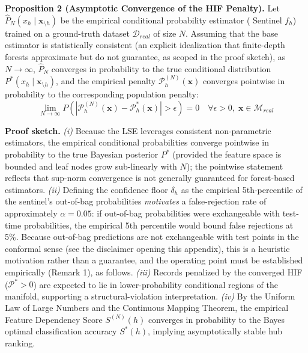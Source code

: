 \documentclass[pdflatex,sn-mathphys-num]{sn-jnl}
\theoremstyle{thmstyleone}%
\theoremstyle{thmstyletwo}%
\theoremstyle{thmstylethree}%
\begin{document}
\begin{appendices}
\textbf{Proposition 2 (Asymptotic Convergence of the HIF Penalty).} Let $\hat{P}_N(x_h \mid \mathbf{x}_{\setminus h})$ be the empirical conditional probability estimator ( Sentinel $f_h$) trained on a ground-truth dataset $\mathcal{D}_{real}$ of size $N$. Assuming that the base estimator is statistically consistent (an explicit idealization that finite-depth forests approximate but do not guarantee, as scoped in the proof sketch), as $N \to \infty$, $\hat{P}_N$ converges in probability to the true conditional distribution $P^*(x_h \mid \mathbf{x}_{\setminus h})$, and the empirical penalty $\mathcal{P}_h^{(N)}(\mathbf{x})$ converges pointwise in probability to the corresponding population penalty:
\begin{equation}
    \lim_{N \to \infty} P\left( \left| \mathcal{P}_h^{(N)}(\mathbf{x}) - \mathcal{P}_h^*(\mathbf{x}) \right| > \epsilon \right) = 0 \quad \forall \epsilon > 0, \; \mathbf{x} \in \mathcal{M}_{real}
\end{equation}

\textbf{Proof sketch.} \emph{(i)} Because the LSE leverages consistent non-parametric estimators, the empirical conditional probabilities converge pointwise in probability to the true Bayesian posterior $P^*$ (provided the feature space is bounded and leaf nodes grow sub-linearly with $N$); the pointwise statement reflects that sup-norm convergence is not generally guaranteed for forest-based estimators. \emph{(ii)} Defining the confidence floor $\delta_h$ as the empirical 5th-percentile of the sentinel's out-of-bag probabilities \emph{motivates} a false-rejection rate of approximately $\alpha = 0.05$: if out-of-bag probabilities were exchangeable with test-time probabilities, the empirical 5th percentile would bound false rejections at 5\%. Because out-of-bag predictions are not exchangeable with test points in the conformal sense (see the disclaimer opening this appendix), this is a heuristic motivation rather than a guarantee, and the operating point must be established empirically (Remark 1), as follows. \emph{(iii)} Records penalized by the converged HIF ($\mathcal{P}^* > 0$) are expected to lie in lower-probability conditional regions of the manifold, supporting a structural-violation interpretation. \emph{(iv)} By the Uniform Law of Large Numbers and the Continuous Mapping Theorem, the empirical Feature Dependency Score $S^{(N)}(h)$ converges in probability to the Bayes optimal classification accuracy $S^*(h)$, implying asymptotically stable hub ranking.


\end{appendices}
\end{document}
